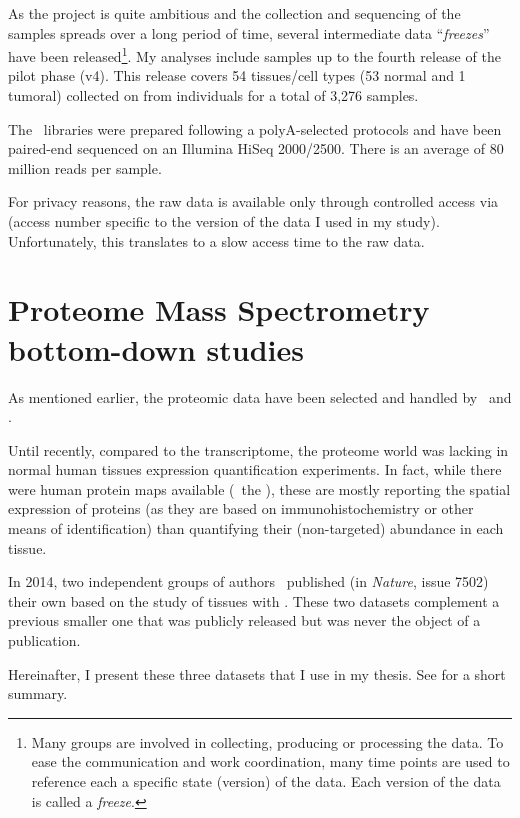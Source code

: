 As the project is quite ambitious and the collection
and sequencing of the samples spreads over a long period of time,
several intermediate data \enquote{\emph{freezes}} have been
released\footnote{Many groups are involved in collecting, producing or processing
the data. To ease the communication and work coordination,
many time points are used to reference each a specific state (version)
of the data. Each version of the data is called a \emph{freeze}.}.
My analyses include samples up to the fourth release of the pilot phase (v4).
This release covers 54 tissues/cell types (53 normal and 1 tumoral)
collected on from individuals for a total of 3,276 samples.

The \Rnaseq\ libraries were prepared following a polyA-selected protocols
and have been paired-end sequenced on an Illumina HiSeq 2000/2500.
There is an average of 80 million reads per sample.

For privacy reasons, the raw data is available only through controlled access via
 (access number specific to the version of the data I used
in my study).
Unfortunately, this translates to a slow access time to the raw data.

\section[Proteome Mass Spectrometry bottom-down studies]%
{Proteome Mass Spectrometry bottom-down studies \quad}\label{sec:ProteoData}

As mentioned earlier,
the proteomic data have been selected and handled by \jyoti\ and \james.

Until recently, compared to the transcriptome, the proteome world
was lacking in normal human tissues expression quantification
experiments. In fact, while there were human protein maps available
(\eg\ the ), these
are mostly reporting the spatial expression of proteins (as they are based
on immunohistochemistry or other means of identification) than quantifying
their (non-targeted) abundance in each tissue.

In 2014, two independent groups of authors~
published (in \textit{Nature},
issue 7502) their own 
based on the study of tissues with \ms. These two datasets complement a previous
smaller one that was publicly released but was never the object of a publication.

Hereinafter, I present these three datasets that I use in my thesis.
See  for a short summary.

